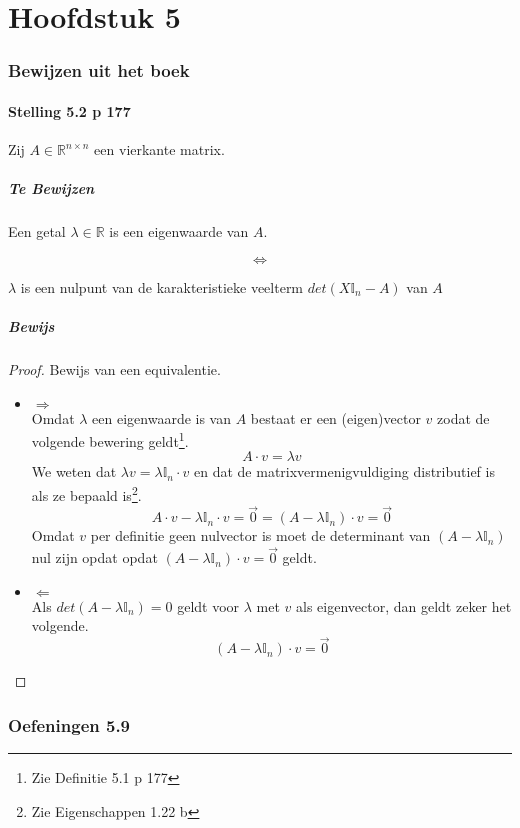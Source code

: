 \documentclass[lineaire_algebra_oplossingen.tex]{subfiles}
\begin{document}
\newpage
\part{Hoofdstuk 5}
\section{Bewijzen uit het boek}

\subsection{Stelling 5.2 p 177}
Zij $A\in \mathbb{R}^{n\times n}$ een vierkante matrix.
\subsubsection*{Te Bewijzen}
\begin{center}
Een getal $\lambda\in\mathbb{R}$ is een eigenwaarde van $A$.
\end{center}
\[\Leftrightarrow\]
\begin{center}
$\lambda$ is een nulpunt van de karakteristieke veelterm $det(X\mathbb{I}_n - A)$ van $A$
\end{center}
\subsubsection*{Bewijs}
\begin{proof}
Bewijs van een equivalentie.
\begin{itemize}
\item $\Rightarrow$\\
Omdat $\lambda$ een eigenwaarde is van $A$ bestaat er een (eigen)vector $v$ zodat de volgende bewering geldt\footnote{Zie Definitie 5.1 p 177}.
\[
A\cdot v = \lambda v
\]
We weten dat $\lambda v =  \lambda \mathbb{I}_n \cdot v$ en dat de matrixvermenigvuldiging distributief is als ze bepaald is\footnote{Zie Eigenschappen 1.22 b}.
\[
A\cdot v - \lambda \mathbb{I}_n \cdot v = \vec{0} = (A-\lambda\mathbb{I}_n)\cdot v = \vec{0}
\]
Omdat $v$ per definitie geen nulvector is moet de determinant van $(A-\lambda\mathbb{I}_n)$ nul zijn opdat opdat $(A-\lambda\mathbb{I}_n)\cdot v = \vec{0}$ geldt.

\item $\Leftarrow$\\
Als $det(A-\lambda\mathbb{I}_n) = 0$ geldt voor $\lambda$ met $v$ als eigenvector, dan geldt zeker het volgende.
\[
(A-\lambda\mathbb{I}_n)\cdot v = \vec{0}
\]

\end{itemize}
\end{proof}

\section{Oefeningen 5.9}
\end{document}
